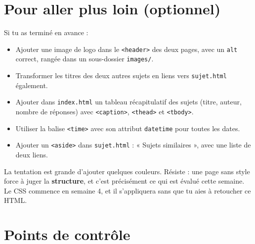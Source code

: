 \documentclass[a4paper,11pt]{article}
\begin{document}
\section{Pour aller plus loin (optionnel)}

Si tu as terminé en avance :

\begin{itemize}
  \item Ajouter une image de logo dans le \texttt{<header>} des deux pages, avec un \texttt{alt} correct, rangée dans un sous-dossier \texttt{images/}.
  \item Transformer les titres des deux autres sujets en liens vers \texttt{sujet.html} également.
  \item Ajouter dans \texttt{index.html} un tableau récapitulatif des sujets (titre, auteur, nombre de réponses) avec \texttt{<caption>}, \texttt{<thead>} et \texttt{<tbody>}.
  \item Utiliser la balise \texttt{<time>} avec son attribut \texttt{datetime} pour toutes les dates.
  \item Ajouter un \texttt{<aside>} dans \texttt{sujet.html} : « Sujets similaires », avec une liste de deux liens.
\end{itemize}

\begin{tcolorbox}[attention, title={Toujours pas de CSS}]
La tentation est grande d'ajouter quelques couleurs. Résiste : une page sans style force à juger la \textbf{structure}, et c'est précisément ce qui est évalué cette semaine. Le CSS commence en semaine 4, et il s'appliquera sans que tu aies à retoucher ce HTML.
\end{tcolorbox}

\section{Points de contrôle}
\end{document}

